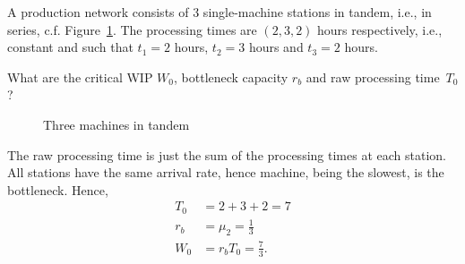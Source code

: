 \begin{question}
  A production network consists of 3 single-machine stations in
  tandem, i.e., in series, c.f. Figure~\ref{fig:tandemraw}. The
  processing times are $(2, 3, 2)$ hours respectively, i.e., constant
  and such that $t_1=2$ hours, $t_2=3$ hours and $t_3=2$ hours.

What are the critical WIP $W_0$, bottleneck
  capacity $r_b$ and raw processing time~$T_0$?

  \begin{figure}[ht]
    \centering

    \caption{Three machines in tandem}
\label{fig:tandemraw}
  \end{figure}

  \begin{solution} 
    The raw processing time is just the sum of the processing times at
    each station. All stations have the same arrival rate, hence
    machine, being the slowest, is the bottleneck. Hence,
 \begin{align*}
      T_0 &= 2 + 3 + 2 = 7\\
   r_b &= \mu_2 = \frac13 \\
      W_0 &= r_b T_0 = \frac73.
    \end{align*}
  \end{solution}
\end{question}


